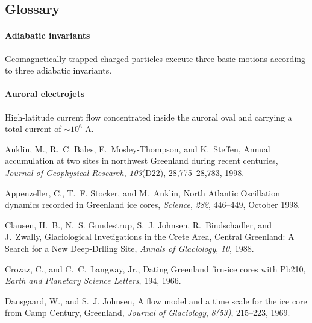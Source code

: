 \documentclass[jgrga]{agu2001}
\begin{document}
\begin{article}
\ifpal\else\ifras\else\iftec\else\ifgrl\else
\section*{Glossary}
\paragraph{Adiabatic invariants}
Geomagnetically trapped charged particles execute three basic motions
according to
three adiabatic invariants.

\paragraph{Auroral electrojets}
High-latitude current flow concentrated inside the auroral oval and 
carrying a total current of $\sim10^6$ A.

\fi\fi\fi\fi



\begin{thebibliography}{}


Anklin, M., R.~C. Bales, E.~Mosley-Thompson, and K.~Steffen, {Annual
  accumulation at two sites in northwest Greenland during recent centuries},
  {\it Journal of Geophysical Research},  {\it 103}(D22), 28,775--28,783, 1998.


Appenzeller, C., T.~F. Stocker, and M.~Anklin, {North Atlantic Oscillation
  dynamics recorded in Greenland ice cores}, {\it Science}, {\it 282},
  446--449, October 1998.


Clausen, H.~B., N.~S. Gundestrup, S.~J. Johnsen, R.~Bindschadler, and
  J.~Zwally, {Glaciological Invetigations in the Crete Area, Central Greenland:
  A Search for a New Deep-Drlling Site}, {\it Annals of Glaciology}, {\it 10},
  1988.


Crozaz, C., and C.~C.~Langway, Jr., {Dating Greenland firn-ice cores with Pb210},
  {\it {Earth and Planetary Science Letters}}, 194, 1966.


Dansgaard, W., and S.~J. Johnsen, {A flow model and a time scale for the ice
  core from Camp Century, Greenland}, {\it Journal of Glaciology}, {\it 8(53)},
  215--223, 1969.



\end{thebibliography}
\end{article}
\end{document}
